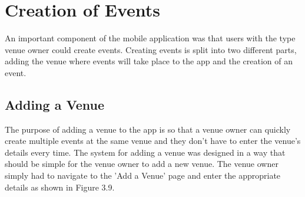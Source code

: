 \section{Creation of Events}
An important component of the mobile application was that users with the type venue owner could create events. Creating events is split into two different parts, adding the venue where events will take place to the app and the creation of an event.

\subsection{Adding a Venue}
The purpose of adding a venue to the app is so that a venue owner can quickly create multiple events at the same venue and they don't have to enter the venue's details every time. The system for adding a venue was designed in a way that should be simple for the venue owner to add a new venue. The venue owner simply had to navigate to the 'Add a Venue' page and enter the appropriate details as shown in Figure 3.9. 

